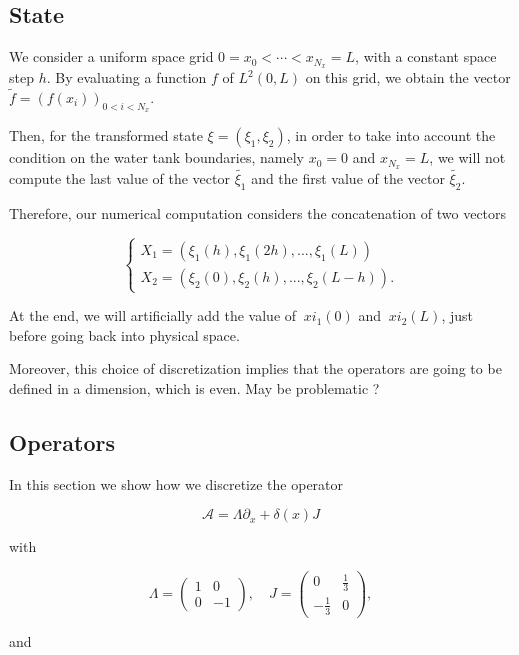 \documentclass[a4paper]{article}
\begin{document}
\subsection{State}

We consider a uniform space grid $0 = x_0 < \cdots < x_{N_x} = L$, 
with a constant space step $h$.
By evaluating a function $f$ of $L^2(0,L)$ on this grid, 
we obtain the vector
$\tilde{f} = (f(x_i))_{0<i<N_x} $.

Then, for the transformed state $\xi = (\xi_1,\xi_2)$,
in order to take into account the condition on the water tank boundaries,
namely $x_0=0$ and $x_{N_x}=L$,
we will not compute the last value of the vector $\tilde{\xi_1}$ 
and the first value of the vector $\tilde{\xi_2}$.

Therefore, our numerical computation considers the concatenation of two vectors 
 
\[
\begin{cases}
	X_1 = ( \xi_1(h), \xi_1(2h),..., \xi_1(L))\\
	X_2 = (\xi_2(0), \xi_2(h),..., \xi_2(L-h)).
\end{cases}
\] 

At the end, we will artificially add the value of $ \ xi_1 (0) $ and $ \ xi_2 (L) $, 
just before going back into physical space.

Moreover, this choice of discretization implies 
that the operators are going to be defined in a dimension, 
which is even. May be problematic ?


\subsection{Operators}

In this section we show how we discretize the operator

\begin{equation}
	\label{def:A}
	\mathcal{A} = \Lambda \partial_x + \delta(x)J
\end{equation}

with 

\[
\Lambda = 
\left(
\begin{matrix}
	1 & 0 \\
	0 & -1 
\end{matrix}
\right), 
\quad
J =
\left(
\begin{matrix}
	0 & \frac{1}{3} \\
	-\frac{1}{3} & 0
\end{matrix}
\right), 
\]

and
\end{document}
